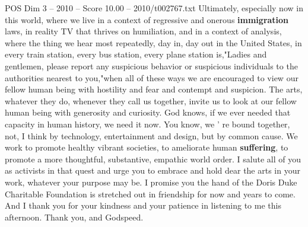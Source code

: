 \begin{textsample}{POS Dim 3 – 2010 – Score 10.00 – 2010/t002767.txt}
Ultimately, especially now in this world, where we live in a context of regressive and onerous \textbf{immigration} laws, in reality TV that thrives on humiliation, and in a context of analysis, where the thing we hear most repeatedly, day in, day out in the United States, in every train station, every bus station, every plane station is,"Ladies and gentlemen, please report any suspicious behavior or suspicious individuals to the authorities nearest to you,"when all of these ways we are encouraged to view our fellow human being with hostility and fear and contempt and suspicion.
The arts, whatever they do, whenever they call us together, invite us to look at our fellow human being with generosity and curiosity.
God knows, if we ever needed that capacity in human history, we need it now.
You know, we ' re bound together, not, I think by technology, entertainment and design, but by common cause.
We work to promote healthy vibrant societies, to ameliorate human \textbf{suffering}, to promote a more thoughtful, substantive, empathic world order.
I salute all of you as activists in that quest and urge you to embrace and hold dear the arts in your work, whatever your purpose may be.
I promise you the hand of the Doris Duke Charitable Foundation is stretched out in friendship for now and years to come.
And I thank you for your kindness and your patience in listening to me this afternoon.
Thank you, and Godspeed.

\end{textsample}
